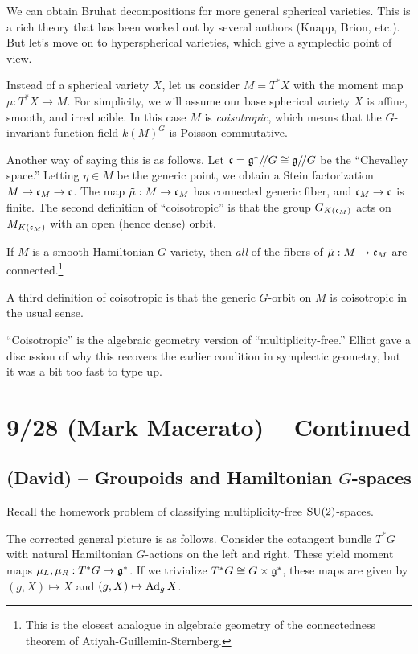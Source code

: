 \documentclass{article}
\begin{document}
We can obtain Bruhat decompositions for more general spherical varieties.
This is a rich theory that has been worked out by several authors (Knapp, Brion, etc.).
But let's move on to hyperspherical varieties, which give a symplectic point of view.

Instead of a spherical variety $X$, let us consider $M = T^*X$ with the moment map $\mu: T^*X \to M$.
For simplicity, we will assume our base spherical variety $X$ is affine, smooth, and irreducible.
In this case $M$ is \emph{coisotropic}, which means that the $G$-invariant function field $k(M)^G$ is Poisson-commutative.

Another way of saying this is as follows.
Let $\mathfrak{c} = \mathfrak{g}^* /\mkern-3mu/ G \cong \mathfrak{g} /\mkern-3mu/ G$ be the ``Chevalley space.''
Letting $\eta \in M$ be the generic point, we obtain a Stein factorization $M \to \mathfrak{c}_M \to \mathfrak{c}$.
The map $\tilde{\mu}: M \to \mathfrak{c}_M$ has connected generic fiber, and $\mathfrak{c}_M \to \mathfrak{c}$ is finite.
The second definition of ``coisotropic'' is that the group $G_{K(\mathfrak{c}_M)}$ acts on $M_{K(\mathfrak{c}_M)}$ with an open (hence dense) orbit.

\begin{thm}[Losev]
	If $M$ is a smooth Hamiltonian $G$-variety, then \emph{all} of the fibers of $\tilde{\mu}: M \to \mathfrak{c}_M$ are connected.\footnote{This is the closest analogue in algebraic geometry of the connectedness theorem of Atiyah-Guillemin-Sternberg.}
\end{thm}

A third definition of coisotropic is that the generic $G$-orbit on $M$ is coisotropic in the usual sense.

``Coisotropic'' is the algebraic geometry version of ``multiplicity-free.''
Elliot gave a discussion of why this recovers the earlier condition in symplectic geometry, but it was a bit too fast to type up.

\section{9/28 (Mark Macerato) -- Continued}

\subsection{(David) -- Groupoids and Hamiltonian $G$-spaces}

Recall the homework problem of classifying multiplicity-free $\operatorname{SU}(2)$-spaces.

The corrected general picture is as follows.
Consider the cotangent bundle $T^*G$ with natural Hamiltonian $G$-actions on the left and right.
These yield moment maps $\mu_L, \mu_R: T^*G \to \mathfrak{g}^*$.
If we trivialize $T^*G \cong G \times \mathfrak{g}^*$, these maps are given by $(g, X) \mapsto X$ and $(g, X) \mapsto \operatorname{Ad}_g X$.
\end{document}
